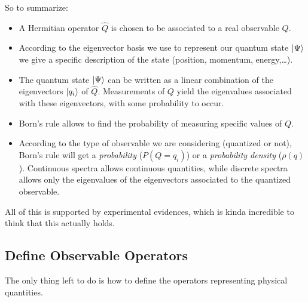 \documentclass[12pt,a4paper]{article}
\begin{document}
So to summarize:
\begin{itemize}
	\item A Hermitian operator $\hat{Q}$ is chosen to be associated to a real observable $Q$.
	\item According to the eigenvector basis we use to represent our quantum state $\ket{\Psi}$
	we give a specific description of the state (position, momentum, energy,\dots).
	\item The quantum state $\ket{\Psi}$ can be written as a linear combination of the 
	eigenvectors ${\ket{q_i}}$ of $\hat{Q}$. Measurements of $Q$ yield the eigenvalues 
	associated with these eigenvectors, with some probability to occur.
	\item Born's rule allows to find the probability of measuring specific values of $Q$.
	\item According to the type of observable we are considering (quantized or not),
	Born's rule will get a \textit{probability} ($P(Q=q_i)$) or a
	\textit{probability density} ($\rho(q)$). Continuous spectra allows continuous
	quantities, while discrete spectra allows only the eigenvalues of the eigenvectors
	associated to the quantized observable.
\end{itemize}
All of this is supported by experimental evidences, which is kinda incredible to think that
this actually holds.

\subsection{Define Observable Operators}
The only thing left to do is how to define the operators representing physical quantities.
\end{document}
